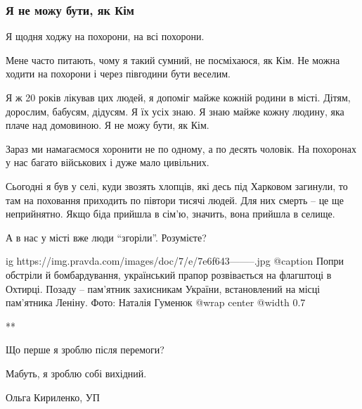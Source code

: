  
 
 
 
 

\subsubsection{Я не можу бути, як Кім}

Я щодня ходжу на похорони, на всі похорони. 

Мене часто питають, чому я такий сумний, не посміхаюся, як Кім. Не можна ходити
на похорони і через півгодини бути веселим.

Я ж 20 років лікував цих людей, я допоміг майже кожній родини в місті. Дітям,
дорослим, бабусям, дідусям. Я їх усіх знаю.  Я знаю майже кожну людину, яка
плаче над домовиною. Я не можу бути, як Кім.

Зараз ми намагаємося хоронити не по одному, а по десять чоловік. На похоронах у
нас багато військових і дуже мало цивільних. 

Сьогодні я був у селі, куди звозять хлопців, які десь під Харковом загинули, то
там на поховання приходить по півтори тисячі людей. Для них смерть – це ще
неприйнятно. Якщо біда прийшла в сім'ю, значить, вона прийшла в селище.

А в нас у місті вже люди \enquote{згоріли}. Розумієте?

\ifcmt
  ig https://img.pravda.com/images/doc/7/e/7e6f643--------.jpg
	@caption Попри обстріли й бомбардування, український прапор розвівається на флагштоці в Охтирці. Позаду – пам'ятник захисникам України, встановлений на місці пам'ятника Леніну. Фото: Наталія Гуменюк
  @wrap center
  @width 0.7
\fi

** 

Що перше я зроблю після перемоги? 

Мабуть, я зроблю собі вихідний.

Ольга Кириленко, УП
